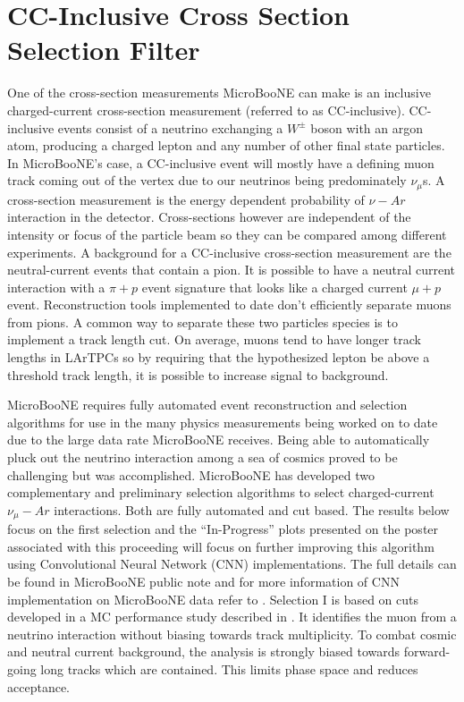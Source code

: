 \chapter{CC-Inclusive Cross Section Selection Filter} \label{ch:meas}

One of the cross-section measurements MicroBooNE can make is an inclusive charged-current cross-section measurement (referred to as CC-inclusive). CC-inclusive events consist of a neutrino exchanging a $W^{\pm}$ boson with an argon atom, producing a charged lepton and any number of other final state particles. In MicroBooNE's case, a CC-inclusive event will mostly have a defining muon track coming out of the vertex due to our neutrinos being predominately $\nu_{\mu}$s. A cross-section measurement is the energy dependent probability of $\nu-Ar$ interaction in the detector. Cross-sections however are independent of the intensity or focus of the particle beam so they can be compared among different experiments. A background for a CC-inclusive cross-section measurement are the neutral-current events that contain a pion. It is possible to have a neutral current interaction with a $\pi+p$ event signature that looks like a charged current $\mu+p$ event. Reconstruction tools implemented to date don't efficiently separate muons from pions. A common way to separate these two particles species is to implement a track length cut. On average, muons tend to have longer track lengths in LArTPCs so by requiring that the hypothesized lepton be above a threshold track length, it is possible to increase signal to background.

MicroBooNE requires fully automated event reconstruction and selection algorithms for use in the many physics measurements being worked on to date due to the large data rate MicroBooNE receives. Being able to automatically pluck out the neutrino interaction among a sea of cosmics proved to be challenging but was accomplished. MicroBooNE has developed two complementary and preliminary selection algorithms to select charged-current $\nu_{\mu}-Ar$ interactions. Both are fully automated and cut based. The results below focus on the first selection and the ``In-Progress'' plots presented on the poster associated with this proceeding will focus on further improving this algorithm using Convolutional Neural Network (CNN) implementations. The full details can be found in MicroBooNE public note \cite{ccinclusive} and for more information of CNN implementation on MicroBooNE data refer to \cite{cnn}. Selection I is based on cuts developed in a MC performance study described in \cite{mcccinclusive}. It identifies the muon from a neutrino interaction without biasing towards track multiplicity. To combat cosmic and neutral current background, the analysis is strongly biased towards forward-going long tracks which are contained. This limits phase space and reduces acceptance. 

